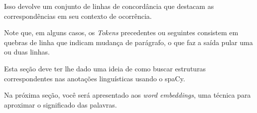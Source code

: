 \documentclass[
  brazilian,
]{article}
\begin{document}
Isso devolve um conjunto de linhas de concordância que destacam as
correspondências em seu contexto de ocorrência.

Note que, em alguns casos, os \emph{Tokens} precedentes ou seguintes
consistem em quebras de linha que indicam mudança de parágrafo, o que
faz a saída pular uma ou duas linhas.

Esta seção deve ter lhe dado uma ideia de como buscar estruturas
correspondentes nas anotações linguísticas usando o spaCy.

Na próxima seção, você será apresentado aos \emph{word embeddings}, uma
técnica para aproximar o significado das palavras.
\end{document}
